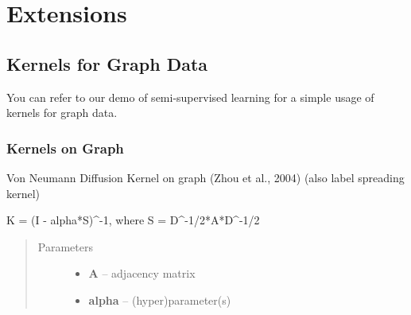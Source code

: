 \documentclass[letterpaper,10pt,english]{sphinxmanual}
\begin{document}
\section{Extensions}
\label{index:extensions}

\subsection{Kernels for Graph Data}
\label{Graph::doc}\label{Graph:kernels-for-graph-data}
You can refer to our demo of semi-supervised learning for a simple usage of kernels for graph data.


\subsubsection{Kernels on Graph}
\label{Graph:semi-supervised-learning}\label{Graph:module-pyGPs.GraphStuff.kernels_on_graph}\label{Graph:kernels-on-graph}

\begin{fulllineitems}
\label{Graph:pyGPs.GraphStuff.kernels_on_graph.VNDKernel}
Von Neumann Diffusion Kernel on graph (Zhou et al., 2004)
(also label spreading kernel)

K = (I - alpha*S)\textasciicircum{}-1, where S = D\textasciicircum{}-1/2*A*D\textasciicircum{}-1/2
\begin{quote}\begin{description}
\item[{Parameters}] \leavevmode\begin{itemize}
\item {} 
\textbf{A} -- adjacency matrix

\item {} 
\textbf{alpha} -- (hyper)parameter(s)

\end{itemize}

\end{description}\end{quote}

\end{fulllineitems}

\end{document}
